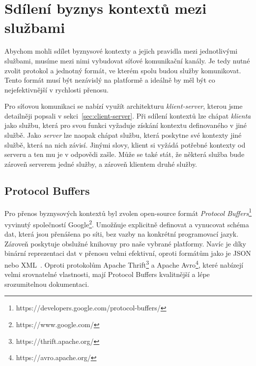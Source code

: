 \section{Sdílení byznys kontextů mezi službami}

Abychom mohli sdílet byznysové kontexty a jejich pravidla
mezi jednotlivými službami, musíme mezi nimi vybudovat
síťové komunikační kanály. Je tedy nutné zvolit protokol
a jednotný formát, ve kterém spolu budou služby komunikovat.
Tento formát musí být nezávislý na platformě a ideálně
by měl být co nejefektivnější v rychlosti přenosu.

Pro síťovou komunikaci se nabízí využít architekturu
\textit{klient-server}, kterou jsme detailněji popsali
v sekci~\ref{sec:client-server}. Při sdílení kontextů
lze chápat \textit{klienta} jako službu, která pro svou funkci
vyžaduje získání kontextu definovaného v jiné službě.
Jako \textit{server} lze naopak chápat službu, která poskytne
své kontexty jiné službě, která na nich závisí. Jinými slovy,
klient si vyžádá potřebné kontexty od serveru a ten mu je v
odpovědi zašle. Může se také stát, že některá služba bude zároveň
serverem jedné služby, a zároveň klientem druhé služby.

\subsection{Protocol Buffers}

Pro přenos byznysových kontextů byl zvolen open-source formát
\textit{Protocol Buffers}\footnote{https://developers.google.com/protocol-buffers/}
vyvinutý společností Google\footnote{https://www.google.com/}.
Umožňuje explicitně definovat a vynucovat schéma dat,
která jsou přenášena po síti, bez vazby na konkrétní programovací
jazyk. Zároveň poskytuje obslužné knihovny pro naše vybrané platformy.
Navíc je díky binární reprezentaci dat v přenosu velmi efektivní,
oproti formátům jako je JSON nebo XML~\cite{varda2008protocol}.
Oproti protokolům Apache Thrift\footnote{https://thrift.apache.org/}
a Apache Avro\footnote{https://avro.apache.org/}, které nabízejí
velmi srovnatelné vlastnosti, mají Protocol Buffers
kvalitnější a lépe srozumitelnou dokumentaci.



